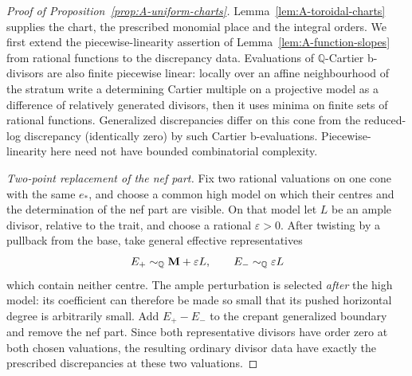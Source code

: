 \begin{proof}[Proof of Proposition~\ref{prop:A-uniform-charts}]
Lemma~\ref{lem:A-toroidal-charts} supplies the chart, the prescribed
monomial place and the integral orders.  We first extend the
piecewise-linearity assertion of Lemma~\ref{lem:A-function-slopes} from
rational functions to the discrepancy data.
Evaluations of \(\mathbb Q\)-Cartier b-divisors are also finite piecewise linear: locally over an affine neighbourhood of the stratum write a determining Cartier multiple on a projective model as a difference of relatively generated divisors, then it uses minima on finite sets of rational functions.
Generalized discrepancies differ on this cone from the reduced-log discrepancy (identically zero) by such Cartier b-evaluations.
Piecewise-linearity here need not have bounded combinatorial complexity.


\emph{Two-point replacement of the nef part.}
Fix two rational valuations on one cone with the same \(e_*\), and
choose a common high model on which their centres and the determination
of the nef part are visible.  On that model let \(L\) be an ample
divisor, relative to the trait, and choose a rational
\(\varepsilon>0\).  After twisting by a pullback from the base, take
general effective representatives
\[
 E_+\sim_{\mathbb Q}\mathbf M+\varepsilon L,\qquad
 E_-\sim_{\mathbb Q}\varepsilon L
\]
which contain neither centre.  The ample perturbation is selected
\emph{after} the high model: its coefficient can therefore be made so
small that its pushed horizontal degree is arbitrarily small.
Add \(E_+-E_-\) to the crepant generalized boundary and remove the nef
part.  Since both representative divisors have order zero at both
chosen valuations, the resulting ordinary divisor data have exactly the
prescribed discrepancies at these two valuations.


\end{proof}
